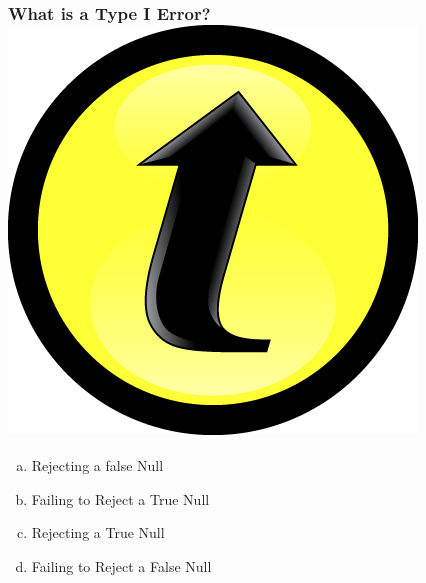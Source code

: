 \documentclass[handout]{beamer}
\date{Lecture 22}
\begin{document}
 





\begin{frame}[plain]
	\titlepage 
	

\end{frame} 

\begin{frame}
\frametitle{What is a Type I Error? \includegraphics[scale = 0.05]{./images/clicker}}

\begin{enumerate}[(a)]
	\item Rejecting a false Null
	\item Failing to Reject a True Null
	\item Rejecting a True Null
	\item Failing to Reject a False Null
\end{enumerate}

\end{frame}
\end{document}
